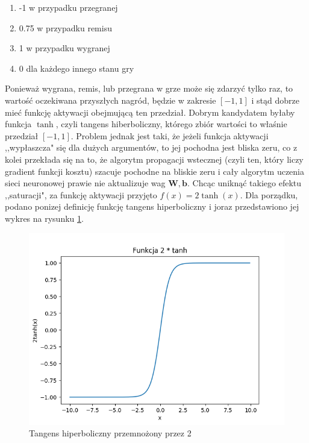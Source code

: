 \documentclass[licencjacka]{pracamgr}
\begin{document}
\begin{enumerate}
	\item{-1 w przypadku przegranej}
	\item{0.75 w przypadku remisu }
	\item{1 w przypadku wygranej}
	\item{0 dla każdego innego stanu gry}
\end{enumerate}

Ponieważ wygrana, remis, lub przegrana w grze może się zdarzyć tylko raz, to wartość oczekiwana przyszłych nagród, będzie w zakresie  $[-1,1]$ i  stąd dobrze mieć funkcję aktywacji obejmującą ten przedział. Dobrym kandydatem byłaby funkcja $\tanh$, czyli tangens hiberboliczny, którego zbiór wartości to właśnie przedział $[-1,1]$. Problem jednak jest taki, że jeżeli funkcja aktywacji ,,wypłaszcza" się dla dużych argumentów, to jej pochodna jest bliska zeru, co z kolei przekłada się na to, że algorytm propagacji wstecznej (czyli ten, który liczy gradient funkcji kosztu) szacuje pochodne na bliskie zeru i cały algorytm uczenia sieci neuronowej prawie nie aktualizuje wag $\mathbf{W}, \mathbf{b}$. Chcąc uniknąć takiego efektu ,,saturacji", za funkcję aktywacji przyjęto $f(x) = 2\tanh(x)$. Dla porządku, podano ponizej definicję funkcję tangens hiperboliczny i joraz przedstawiono jej wykres na rysunku \ref{Rys24}.

\begin{figure}[h!]
	\includegraphics [scale=0.5]{tanh.png}
	\caption{Tangens hiperboliczny przemnożony przez 2}
	\label{Rys24}
\end{figure}
\end{document}
